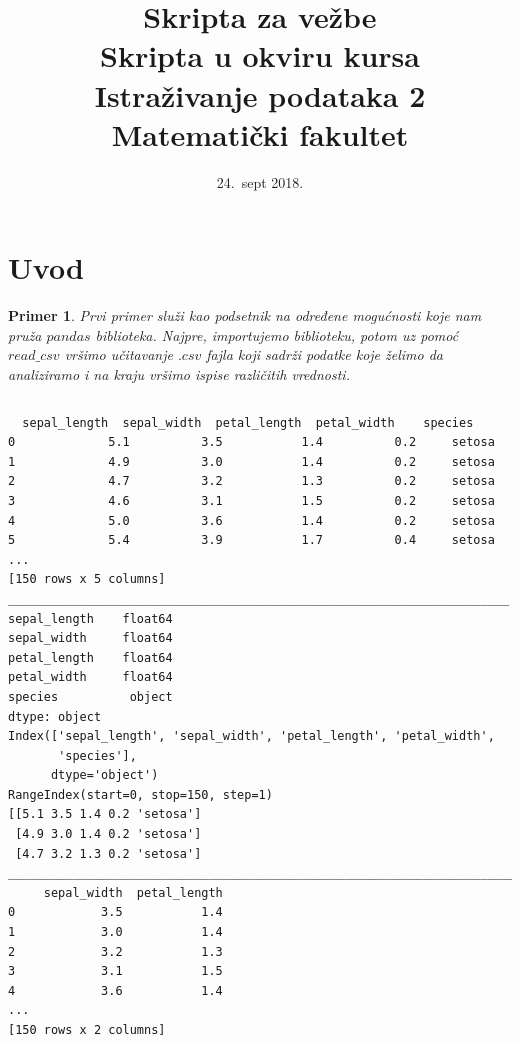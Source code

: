 \documentclass[a4paper]{article}
\newtheorem{primer}{Primer}[section]
\begin{document}
\title{Skripta za vežbe\\ \small{Skripta u okviru kursa\\Istraživanje podataka 2\\ Matematički fakultet}}

\date{24.~sept 2018.}
\maketitle


\tableofcontents

\newpage

\section{Uvod}
\label{sec:uvod}



\begin{primer}
Prvi primer služi kao podsetnik na određene mogućnosti koje nam pruža $pandas$ biblioteka.  
Najpre, importujemo biblioteku, potom uz pomoć $read\_csv$ vršimo učitavanje $.csv$ fajla koji sadrži podatke koje želimo da analiziramo i na kraju vršimo ispise različitih vrednosti.
\end{primer}
\inputminted{python}{Codes/1/pandas-example.py}
\begin{lstlisting}
  sepal_length  sepal_width  petal_length  petal_width    species
0        	  5.1          3.5           1.4          0.2     setosa
1             4.9          3.0           1.4          0.2     setosa
2             4.7          3.2           1.3          0.2     setosa
3             4.6          3.1           1.5          0.2     setosa
4             5.0          3.6           1.4          0.2     setosa
5             5.4          3.9           1.7          0.4     setosa
...
[150 rows x 5 columns]
______________________________________________________________________
sepal_length    float64
sepal_width     float64
petal_length    float64
petal_width     float64
species          object
dtype: object
Index(['sepal_length', 'sepal_width', 'petal_length', 'petal_width',
       'species'],
      dtype='object')
RangeIndex(start=0, stop=150, step=1)
[[5.1 3.5 1.4 0.2 'setosa']
 [4.9 3.0 1.4 0.2 'setosa']
 [4.7 3.2 1.3 0.2 'setosa']
________________________________________________________________________
     sepal_width  petal_length
0            3.5           1.4
1            3.0           1.4
2            3.2           1.3
3            3.1           1.5
4            3.6           1.4
...
[150 rows x 2 columns]
\end{lstlisting}
\end{document}
